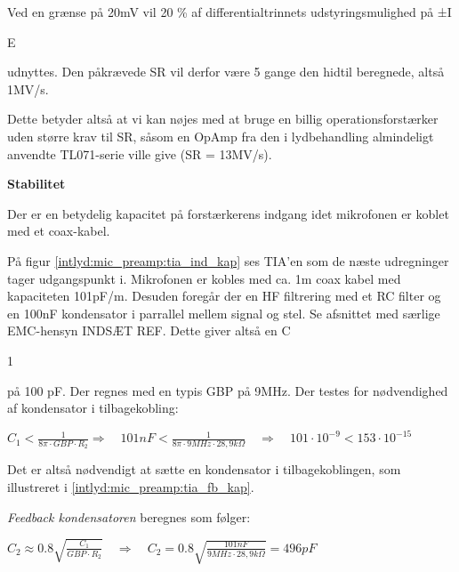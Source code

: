 Ved en grænse på 20mV vil 20 \% af differentialtrinnets udstyringsmulighed på ±I\begin{tiny}E\end{tiny} udnyttes. Den påkrævede SR vil derfor være 5 gange den hidtil beregnede, altså 1MV/s.

Dette betyder altså at vi kan nøjes med at bruge en billig operationsforstærker uden større krav til SR, såsom en OpAmp fra den i lydbehandling almindeligt anvendte TL071-serie ville give (SR = 13MV/s).

\textbf{Stabilitet}

Der er en betydelig kapacitet på forstærkerens indgang idet mikrofonen er koblet med et coax-kabel.


På figur \ref{intlyd:mic_preamp:tia_ind_kap} ses TIA'en som de næste udregninger tager udgangspunkt i. Mikrofonen er kobles med ca. 1m coax kabel med kapaciteten 101pF/m. Desuden foregår der en HF filtrering med et RC filter og en 100nF kondensator i parrallel mellem signal og stel. Se afsnittet med særlige EMC-hensyn INDSÆT REF. Dette giver altså en C\begin{tiny}1\end{tiny} på 100 pF.
Der regnes med en typis GBP på 9MHz. Der testes for nødvendighed af kondensator i tilbagekobling:
\begin{center}
${ C }_{ 1 }<\frac { 1 }{ 8\pi \cdot GBP\cdot { R }_{ 2 } } \Longrightarrow \quad 101nF<\frac { 1 }{ 8\pi \cdot 9MHz\cdot 28,9k\Omega  } \quad \Longrightarrow \quad 101\cdot { 10 }^{ -9 }<153\cdot { 10 }^{ -15 }$
\end{center}
Det er altså nødvendigt at sætte en kondensator i tilbagekoblingen, som illustreret i \ref{intlyd:mic_preamp:tia_fb_kap}.


\textit{Feedback kondensatoren} beregnes som følger:
\begin{center}
${ C }_{ 2 }\approx 0.8\sqrt { \frac { { C }_{ 1 } }{ GBP\cdot { R }_{ 2 } }  } \quad \Longrightarrow \quad { C }_{ 2 }=0.8\sqrt { \frac { 101nF }{ 9MHz\cdot 28,9k\Omega  }  } =496pF\quad$
\end{center}

